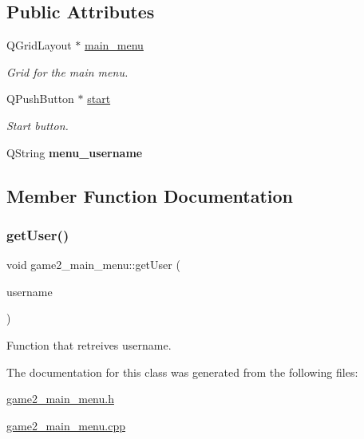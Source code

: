 \subsection*{Public Attributes}
\begin{DoxyCompactItemize}
\item 
\mbox{\label{classgame2__main__menu_a1da7101d69e9b4748d7d1c8a11c04edc}} 
Q\+Grid\+Layout $\ast$ \hyperlink{classgame2__main__menu_a1da7101d69e9b4748d7d1c8a11c04edc}{main\+\_\+menu}
\begin{DoxyCompactList}\small\item\em Grid for the main menu. \end{DoxyCompactList}\item 
\mbox{\label{classgame2__main__menu_aa7c54c525cc6e3608cd2402195bb3d79}} 
Q\+Push\+Button $\ast$ \hyperlink{classgame2__main__menu_aa7c54c525cc6e3608cd2402195bb3d79}{start}
\begin{DoxyCompactList}\small\item\em Start button. \end{DoxyCompactList}\item 
\mbox{\label{classgame2__main__menu_a2ba46b5b8e3a389e3e46c6ab3a34febe}} 
Q\+String {\bfseries menu\+\_\+username}
\end{DoxyCompactItemize}


\subsection{Member Function Documentation}
\mbox{\label{classgame2__main__menu_aa77f5a5ba961a25e6f9ed6112de186ad}} 
\subsubsection{\texorpdfstring{get\+User()}{getUser()}}
{\footnotesize\ttfamily void game2\+\_\+main\+\_\+menu\+::get\+User (\begin{DoxyParamCaption}\item[{Q\+String}]{username }\end{DoxyParamCaption})}



Function that retreives username. 



The documentation for this class was generated from the following files\+:\begin{DoxyCompactItemize}
\item 
\hyperlink{game2__main__menu_8h}{game2\+\_\+main\+\_\+menu.\+h}\item 
\hyperlink{game2__main__menu_8cpp}{game2\+\_\+main\+\_\+menu.\+cpp}\end{DoxyCompactItemize}
